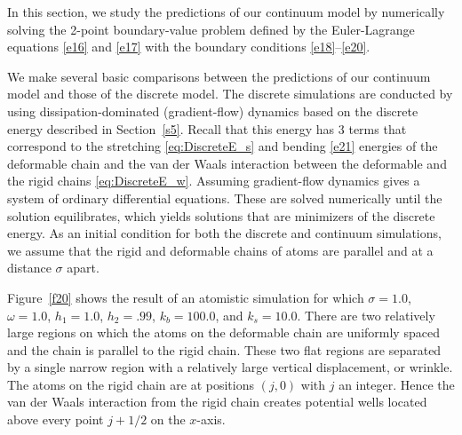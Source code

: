 \documentclass{siamltex}
\begin{document}
In this section, we study the predictions of our continuum model by
numerically solving the 2-point boundary-value problem defined by the
Euler-Lagrange equations \eqref{e16} and \eqref{e17} with the boundary
conditions \eqref{e18}--\eqref{e20}. 


We make several basic comparisons between the predictions of our
continuum model and {those} of the discrete model.  The discrete simulations are conducted by using
dissipation-dominated (gradient-flow) dynamics based on the discrete
energy described in Section~\ref{s5}.  Recall that this energy has 3
terms that correspond to the stretching \eqref{eq:DiscreteE_s} and
bending \eqref{e21} energies of the deformable chain and the van der
Waals interaction between the deformable and the rigid chains
\eqref{eq:DiscreteE_w}.  Assuming gradient-flow dynamics gives a
system of ordinary differential equations.  These are solved
numerically until the solution equilibrates, which yields solutions
that are minimizers of the discrete energy.
{As an initial condition for both the discrete and continuum simulations, we assume that the rigid and deformable chains of atoms are parallel and at a distance $\sigma$ apart.}


Figure~\ref{f20} shows the result of an atomistic simulation for which
{$\sigma=1.0$, $\omega=1.0$, $h_{1}=1.0$, $h_{2}=.99$, $k_b=100.0$, and $k_s=10.0$}.  There are two relatively large
regions on which the atoms on the deformable chain are uniformly spaced and the
chain is parallel to the rigid chain.  These two flat regions are
separated by a single narrow region with a relatively large
vertical displacement, or wrinkle.  The atoms on the rigid chain are
at positions $(j,0)$ with $j$ an integer.  Hence the van der Waals
interaction from the rigid chain creates potential wells located above
every point $j+1/2$ on the $x$-axis.
\end{document}
